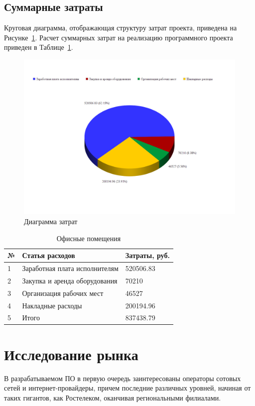 \subsection{Суммарные затраты}
Круговая диаграмма, отображающая структуру затрат проекта, приведена на Рисунке~\ref{fig:circle_diagram}. Расчет суммарных затрат на реализацию программного проекта приведен в Таблице~\ref{table:all_expenses}.

\begin{figure}
\caption{Диаграмма затрат}
\label{fig:circle_diagram}
\centering
\includegraphics[scale=0.4]{pictures/circle_diagram}
\end{figure}

\begin{table}
\caption{Офисные помещения}
\label{table:all_expenses}
\begin{tabular} {| l | l | l |} 
\hline
№ & Статья расходов & Затраты, руб.\\
\hline
1 &  Заработная плата исполнителям & 520506.83\\
\hline
2 & Закупка и аренда оборудования & 70210\\
\hline
3 & Организация рабочих мест & 46527\\
\hline
4 & Накладные расходы & 200194.96\\
\hline
5 & Итого & 837438.79\\
\hline
\end{tabular}
\end{table}


\section{Исследование рынка}
В разрабатываемом ПО в первую очередь заинтересованы операторы сотовых сетей и интернет-провайдеры, причем последние различных уровней, начиная от таких гигантов, как Ростелеком, оканчивая региональными филиалами.

